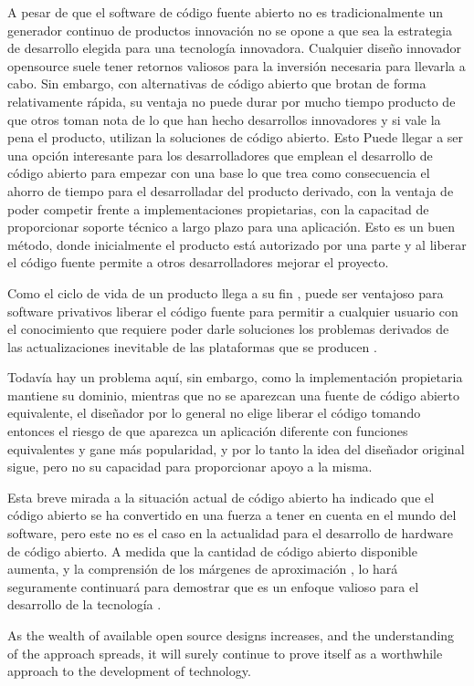 A pesar de que el software de código fuente abierto no es tradicionalmente un generador continuo de productos innovación no se opone a que sea la estrategia de desarrollo elegida para una tecnología innovadora. Cualquier diseño innovador opensource suele tener retornos valiosos para la inversión necesaria para llevarla a cabo. Sin embargo, con alternativas de código abierto que brotan de forma relativamente rápida, su ventaja no puede durar por mucho tiempo producto de que otros toman nota de lo que han hecho desarrollos innovadores y si vale la pena el producto, utilizan la soluciones de código abierto. Esto  Puede llegar a ser una opción interesante para los desarrolladores que emplean el desarrollo de código abierto para empezar con una base lo que trea como consecuencia el ahorro de tiempo para el desarrolladar del producto derivado, con la ventaja  de poder competir frente a  implementaciones propietarias, con la capacitad de proporcionar soporte técnico a largo plazo para una aplicación. Esto es un buen método, donde inicialmente el producto está autorizado por una parte y al liberar  el código fuente permite a otros desarrolladores mejorar el proyecto.

Como el ciclo de vida de un producto llega a su fin , puede ser ventajoso para software privativos liberar el código fuente para permitir a cualquier usuario con el conocimiento que requiere poder darle soluciones los problemas derivados de las actualizaciones inevitable de las plataformas que se producen . 

Todavía hay un problema aquí, sin embargo, como la implementación propietaria
mantiene su dominio, mientras que no se aparezcan una fuente de código abierto equivalente, el diseñador por lo general no elige liberar el código tomando entonces el riesgo de que aparezca un aplicación diferente con funciones equivalentes y gane más popularidad,  y por lo tanto la idea del diseñador original sigue, pero no su capacidad para proporcionar apoyo a la misma.

Esta breve mirada a la situación actual de código abierto ha indicado que el código abierto
se ha convertido en una fuerza a tener en cuenta en el mundo del software, pero este no es el caso en la actualidad para el desarrollo de hardware de código abierto.
 A medida que la cantidad de código abierto disponible aumenta, y la comprensión de los márgenes de aproximación , lo hará
seguramente continuará para demostrar que es un enfoque valioso para el desarrollo de
la tecnología .

As the wealth of available open source designs increases, and the understanding of the approach spreads, it will surely continue to prove itself as a worthwhile approach to the development of technology.

